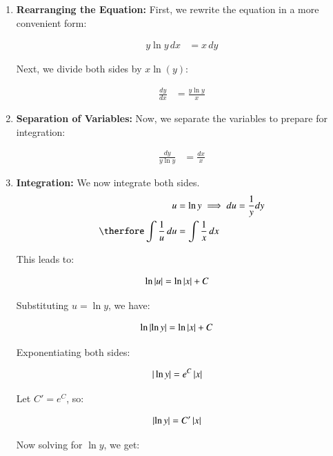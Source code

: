 \documentclass[journal]{IEEEtran}
\begin{document}
\begin{enumerate}
    \item \textbf{Rearranging the Equation:} First, we rewrite the equation in a more convenient form:

    \begin{align}
	    y \ln{y} \, dx &= x \, dy
    \end{align}

    Next, we divide both sides by $ x \ln(y) $:

    \begin{align}
	    \frac{dy}{dx} &= \frac{y \ln{y}}{x}
    \end{align}
    
    \item \textbf{Separation of Variables:} Now, we separate the variables to prepare for integration:

    \begin{align}
	    \frac{dy}{y \ln{y}} &= \frac{dx}{x}
    \end{align}
    
    \item \textbf{Integration:} We now integrate both sides.\\     
    \begin{align}
	    u &= \ln{y} \implies du = \frac{1}{y} dy \\   
	    {\therfore} \int \frac{1}{u} \, du &= \int \frac{1}{x} \, dx
    \end{align}

    This leads to:

    \begin{align}
	    \ln\left\vert u\right\vert &= \ln\left\vert x\right\vert + C
    \end{align}

		Substituting $ u = \ln{y} $, we have:

    \begin{align}
	    \ln\left\vert\ln{y}\right\vert &= \ln|x| + C
    \end{align}

    Exponentiating both sides:

    \begin{align}
	    |\ln{y}| &= e^C \left\vert x\right\vert
    \end{align}

    Let $ C' = e^C $, so:

    \begin{align}
	    \left\vert\ln{y}\right\vert&= C^\prime \left\vert x\right\vert
    \end{align}

		Now solving for $ \ln{y} $, we get:


\end{enumerate}
\end{document}
